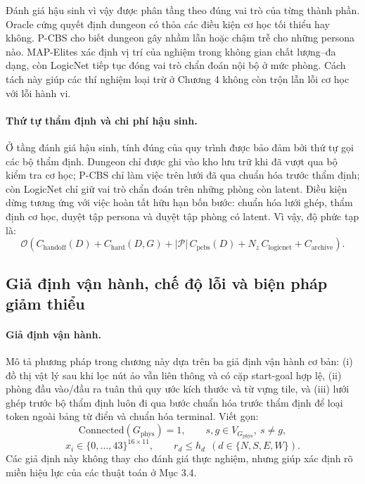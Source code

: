 \documentclass[oneside,a4paper,12pt]{extreport}
\begin{document}
Đánh giá hậu sinh vì vậy được phân tầng theo đúng vai trò của từng thành phần.
Oracle cứng quyết định dungeon có thỏa các điều kiện cơ học tối thiểu hay không.
P-CBS cho biết dungeon gây nhầm lẫn hoặc chậm trễ cho những persona nào.
MAP-Elites xác định vị trí của nghiệm trong không gian chất lượng--đa dạng, còn
LogicNet tiếp tục đóng vai trò chẩn đoán nội bộ ở mức phòng. Cách tách này
giúp các thí nghiệm loại trừ ở Chương 4 không còn trộn lẫn lỗi cơ học với lỗi
hành vi.

\paragraph{Thứ tự thẩm định và chi phí hậu sinh.}
Ở tầng đánh giá hậu sinh, tính đúng của quy trình được bảo đảm bởi thứ tự gọi
các bộ thẩm định. Dungeon chỉ được ghi vào kho lưu trữ khi đã vượt qua bộ kiểm tra cơ
học; P-CBS chỉ làm việc trên lưới đã qua chuẩn hóa trước thẩm định; còn LogicNet chỉ
giữ vai trò chẩn đoán trên những phòng còn latent. Điều kiện dừng tương ứng với
việc hoàn tất hữu hạn bốn bước: chuẩn hóa lưới ghép, thẩm định cơ học, duyệt
tập persona và duyệt tập phòng có latent. Vì vậy, độ phức tạp là:
\begin{equation}
\mathcal{O}\!\left(
C_{\mathrm{handoff}}(D)+
C_{\mathrm{hard}}(D,G)+
|\mathcal{P}|\,C_{\mathrm{pcbs}}(D)+
N_z\,C_{\mathrm{logicnet}}+
C_{\mathrm{archive}}
\right).
\end{equation}

\subsection{Giả định vận hành, chế độ lỗi và biện pháp giảm thiểu}
\paragraph{Giả định vận hành.}
Mô tả phương pháp trong chương này dựa trên ba giả định vận hành cơ bản: (i) đồ thị vật lý sau khi lọc nút ảo vẫn liên thông và có cặp start-goal hợp lệ, (ii) phòng đầu vào/đầu ra tuân thủ quy ước kích thước và từ vựng tile, và (iii) lưới ghép trước bộ thẩm định luôn đi qua bước chuẩn hóa trước thẩm định để loại token ngoài bảng từ điển và chuẩn hóa terminal. Viết gọn:
\begin{equation}
\mathrm{Connected}(G_{\mathrm{phys}})=1,\qquad s,g\in V_{G_{\mathrm{phys}}},\ s\neq g,
\end{equation}
\begin{equation}
x_i\in\{0,\ldots,43\}^{16\times 11},\qquad
r_d\le h_d\ \ (d\in\{N,S,E,W\}).
\end{equation}
Các giả định này không thay cho đánh giá thực nghiệm, nhưng giúp xác định rõ miền hiệu lực của các thuật toán ở Mục 3.4.
\end{document}
